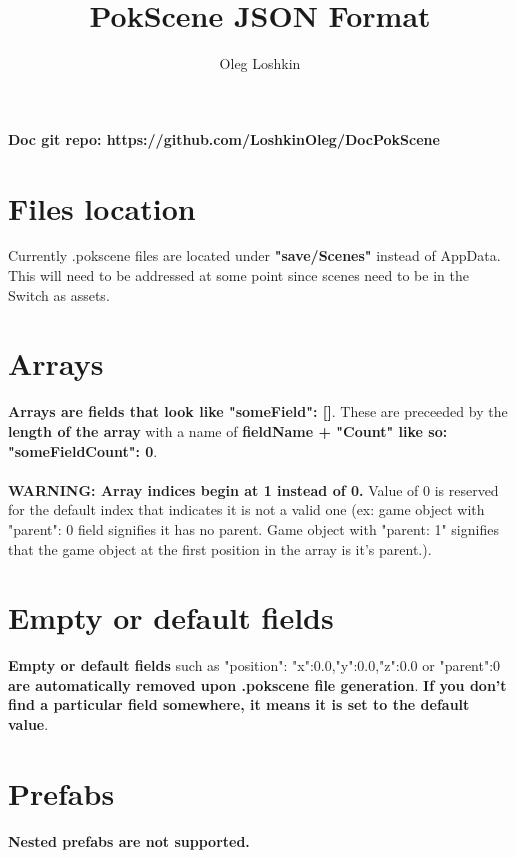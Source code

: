 \documentclass[10pt,a4paper]{article}
\author{Oleg Loshkin}
\title{PokScene JSON Format}
\begin{document}
\maketitle
\noindent \textbf{Doc git repo: https://github.com/LoshkinOleg/DocPokScene}

\section{Files location}
Currently .pokscene files are located under \textbf{"save/Scenes"} instead of AppData. This will need to be addressed at some point since scenes need to be in the Switch as assets.

\section{Arrays}
\textbf{Arrays are fields that look like "someField": []}. These are preceeded by the \textbf{length of the array} with a name of \textbf{fieldName + "Count" like so: "someFieldCount": 0}.\\\\
\textbf{WARNING: Array indices begin at 1 instead of 0.} Value of 0 is reserved for the default index that indicates it is not a valid one (ex: game object with "parent": 0 field signifies it has no parent. Game object with "parent: 1" signifies that the game object at the first position in the array is it's parent.).

\section{Empty or default fields}
\textbf{Empty or default fields} such as "position": {"x":0.0,"y":0.0,"z":0.0} or "parent":0 \textbf{are automatically removed upon .pokscene file generation}. \textbf{If you don't find a particular field somewhere, it means it is set to the default value}.

\section{Prefabs}
\textbf{Nested prefabs are not supported.}

\newpage
\end{document}
